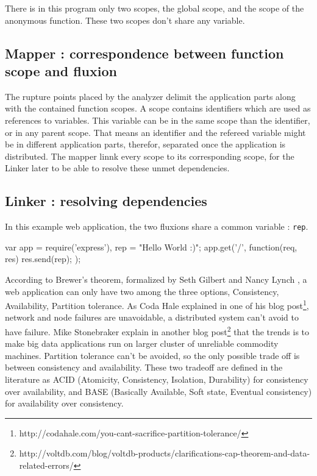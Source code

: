 
There is in this program only two scopes, the global scope, and the scope of the anonymous function.
These two scopes don't share any variable.



\subsection{Mapper : correspondence between function scope and fluxion}

The rupture points placed by the analyzer delimit the application parts along with the contained function scopes.
A scope contains identifiers which are used as references to variables.
This variable can be in the same scope than the identifier, or in any parent scope.
That means an identifier and the refereed variable might be in different application parts, therefor, separated once the application is distributed.
The mapper linnk every scope to its corresponding scope, for the Linker later to be able to resolve these unmet dependencies.

\subsection{Linker : resolving dependencies} \label{ss:linker}

In this example web application, the two fluxions share a common variable : \texttt{rep}.

\begin{code}[Javascript, caption={Hello World with a shared variable},label={lst:sharedhello}]
var app = require('express'),
    rep = "Hello World :)";
app.get('/', function(req, res) {
  res.send(rep);
});
\end{code}

According to Brewer's theorem, formalized by Seth Gilbert and Nancy Lynch \cite{Gilbert2002}, a web application can only have two among the three options, Consistency, Availability, Partition tolerance.
As Coda Hale explained in one of his blog post\footnote{http://codahale.com/you-cant-sacrifice-partition-tolerance/}, network and node failures are unavoidable, a distributed system can't avoid to have failure.
Mike Stonebraker explain in another blog post\footnote{http://voltdb.com/blog/voltdb-products/clarifications-cap-theorem-and-data-related-errors/} that the trends is to make big data applications run on larger cluster of unreliable commodity machines.
Partition tolerance can't be avoided, so the only possible trade off is between consistency and availability.
These two tradeoff are defined in the literature as ACID (Atomicity, Consistency, Isolation, Durability) for consistency over availability, and BASE (Basically Available, Soft state, Eventual consistency) for availability over consistency.

